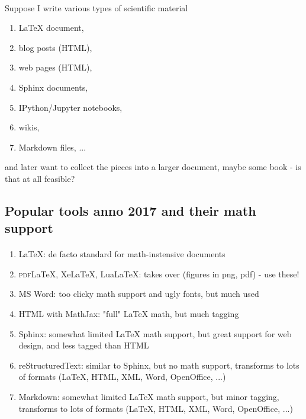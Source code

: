 \documentclass[%
oneside,                 %
final,                   %
10pt]{article}
\begin{document}
\paragraph{}
Suppose I write various types of scientific material
\begin{enumerate}
\item {\LaTeX} document,

\item blog posts (HTML),

\item web pages (HTML),

\item Sphinx documents,

\item IPython/Jupyter notebooks,

\item wikis,

\item Markdown files, ...
\end{enumerate}

\noindent
and later want to collect the pieces into a larger document, maybe some book - is that at all feasible?




\subsection{Popular tools anno 2017 and their math support}

\paragraph{}
\begin{enumerate}
\item {\LaTeX}: de facto standard for math-instensive documents

\item \textsc{pdf}{\LaTeX}, XeLaTeX, LuaLaTeX: takes over (figures in png, pdf) - use these!

\item MS Word: too clicky math support and ugly fonts, but much used

\item HTML with MathJax: "full" {\LaTeX} math, but much tagging

\item Sphinx: somewhat limited {\LaTeX} math support, but great support for web design, and less tagged than HTML

\item reStructuredText: similar to Sphinx, but no math support, transforms to lots of formats ({\LaTeX}, HTML, XML, Word, OpenOffice, ...)

\item Markdown: somewhat limited {\LaTeX} math support, but minor tagging, transforms to lots of formats ({\LaTeX}, HTML, XML, Word, OpenOffice, ...)
\end{enumerate}
\end{document}
